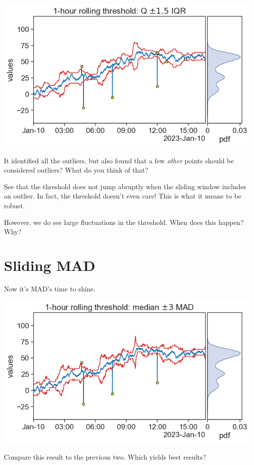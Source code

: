 \documentclass[
  letterpaper,
  DIV=11,
  numbers=noendperiod,
  oneside]{scrreprt}
\begin{document}
\includegraphics{outliers/outliers_rolling_IQR.png}

It identified all the outliers, but also found that a few \emph{other}
points should be considered outliers? What do you think of that?

See that the threshold does not jump abruptly when the sliding window
includes an outlier. In fact, the threshold doesn't even care! This is
what it means to be robust.

However, we do see large fluctuations in the threshold. When does this
happen? Why?

\hypertarget{sliding-mad}{%
\section{Sliding MAD}\label{sliding-mad}}

Now it's MAD's time to shine.

\includegraphics{outliers/outliers_rolling_MAD.png}

Compare this result to the previous two. Which yields best results?
\end{document}
